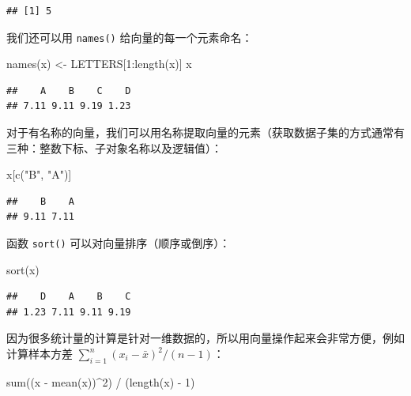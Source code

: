 \documentclass[
  b5paper,
  UTF8,twoside]{book}
\newenvironment{Shaded}{\begin{snugshade}}{\end{snugshade}}
\newcommand{\DecValTok}[1]{\textcolor[rgb]{0.00,0.00,0.81}{#1}}
\newcommand{\FunctionTok}[1]{\textcolor[rgb]{0.00,0.00,0.00}{#1}}
\newcommand{\NormalTok}[1]{#1}
\newcommand{\OtherTok}[1]{\textcolor[rgb]{0.56,0.35,0.01}{#1}}
\newcommand{\SpecialCharTok}[1]{\textcolor[rgb]{0.00,0.00,0.00}{#1}}
\newcommand{\StringTok}[1]{\textcolor[rgb]{0.31,0.60,0.02}{#1}}
\begin{document}
\begin{verbatim}
## [1] 5
\end{verbatim}

我们还可以用 \texttt{names()} 给向量的每一个元素命名：

\begin{Shaded}
\begin{Highlighting}[]
\FunctionTok{names}\NormalTok{(x) }\OtherTok{\textless{}{-}}\NormalTok{ LETTERS[}\DecValTok{1}\SpecialCharTok{:}\FunctionTok{length}\NormalTok{(x)]}
\NormalTok{x}
\end{Highlighting}
\end{Shaded}

\begin{verbatim}
##    A    B    C    D 
## 7.11 9.11 9.19 1.23
\end{verbatim}

对于有名称的向量，我们可以用名称提取向量的元素（获取数据子集的方式通常有三种：整数下标、子对象名称以及逻辑值）：

\begin{Shaded}
\begin{Highlighting}[]
\NormalTok{x[}\FunctionTok{c}\NormalTok{(}\StringTok{"B"}\NormalTok{, }\StringTok{"A"}\NormalTok{)]}
\end{Highlighting}
\end{Shaded}

\begin{verbatim}
##    B    A 
## 9.11 7.11
\end{verbatim}

函数 \texttt{sort()} 可以对向量排序（顺序或倒序）：

\begin{Shaded}
\begin{Highlighting}[]
\FunctionTok{sort}\NormalTok{(x)}
\end{Highlighting}
\end{Shaded}

\begin{verbatim}
##    D    A    B    C 
## 1.23 7.11 9.11 9.19
\end{verbatim}

因为很多统计量的计算是针对一维数据的，所以用向量操作起来会非常方便，例如计算样本方差 \(\sum_{i=1}^{n}(x_{i}-\bar{x})^{2}/(n-1)\)：

\begin{Shaded}
\begin{Highlighting}[]
\FunctionTok{sum}\NormalTok{((x }\SpecialCharTok{{-}} \FunctionTok{mean}\NormalTok{(x))}\SpecialCharTok{\^{}}\DecValTok{2}\NormalTok{) }\SpecialCharTok{/}\NormalTok{ (}\FunctionTok{length}\NormalTok{(x) }\SpecialCharTok{{-}} \DecValTok{1}\NormalTok{)}
\end{Highlighting}
\end{Shaded}
\end{document}
